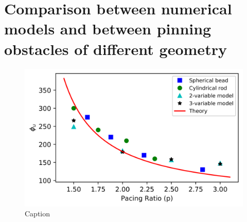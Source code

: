 \documentclass[%
 reprint,
 amsmath,amssymb,
 aps,
prb,
]{revtex4-2}
\begin{document}
\appendix

\section{Comparison between numerical models and between pinning obstacles of different geometry}

\begin{figure}[H]
    \centering
    \includegraphics{appendix_23oregonator_beadrod.png}
    \caption{Caption}
    \label{fig:unpinning_comparison}
\end{figure}


\nocite{*}

\end{document}

